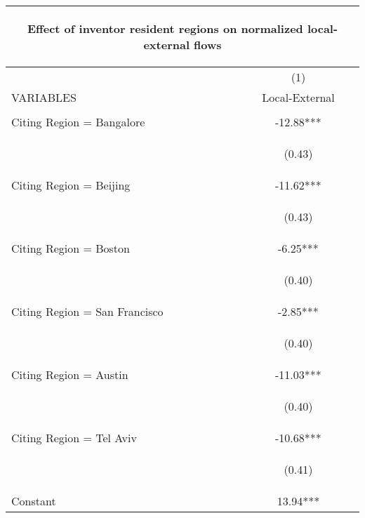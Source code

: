 \begin{center}
\begin{tabular}{lc}
\multicolumn{2}{c}{\begin{large}Effect of inventor resident regions on normalized local-external flows \label{slocalexternal}\end{large}} \\ \hline
 & (1) \\
VARIABLES & Local-External \\ \hline
\vspace{4pt} & \begin{footnotesize}\end{footnotesize} \\
Citing Region = Bangalore & -12.88*** \\
\vspace{4pt} & \begin{footnotesize}(0.43)\end{footnotesize} \\
Citing Region = Beijing & -11.62*** \\
\vspace{4pt} & \begin{footnotesize}(0.43)\end{footnotesize} \\
Citing Region = Boston & -6.25*** \\
\vspace{4pt} & \begin{footnotesize}(0.40)\end{footnotesize} \\
Citing Region = San Francisco & -2.85*** \\
\vspace{4pt} & \begin{footnotesize}(0.40)\end{footnotesize} \\
Citing Region = Austin & -11.03*** \\
\vspace{4pt} & \begin{footnotesize}(0.40)\end{footnotesize} \\
Citing Region = Tel Aviv & -10.68*** \\
\vspace{4pt} & \begin{footnotesize}(0.41)\end{footnotesize} \\
Constant & 13.94*** \\

\end{tabular}
\end{center}
